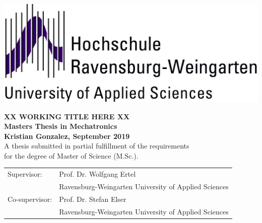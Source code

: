 \pagestyle{empty}
\begin{flushright}
\includegraphics[scale=0.5]{imgs/hswgt.jpg}
\end{flushright}

\begin{center}
\vspace*{5cm}

\huge
\textbf{XX WORKING TITLE HERE XX}\\
\Large
\vspace*{2cm}
\noindent \textbf{Masters Thesis in Mechatronics}\\
\vspace*{0.5cm}
\noindent \textbf{Kristian Gonzalez, September 2019}\\
\vspace*{2cm}
\normalsize 
A thesis submitted in partial fulfillment of the requirements\\ for the degree
of Master of Science (M.Sc.).

\end{center}

\vspace*{4.5cm}
\begin{tabular}{ll}
Supervisor: & Prof. Dr. Wolfgang Ertel \\
 & Ravensburg-Weingarten University of Applied Sciences\\
Co-supervisor: & Prof. Dr. Stefan Elser\\
 & Ravensburg-Weingarten University of Applied Sciences\\
\end{tabular}


